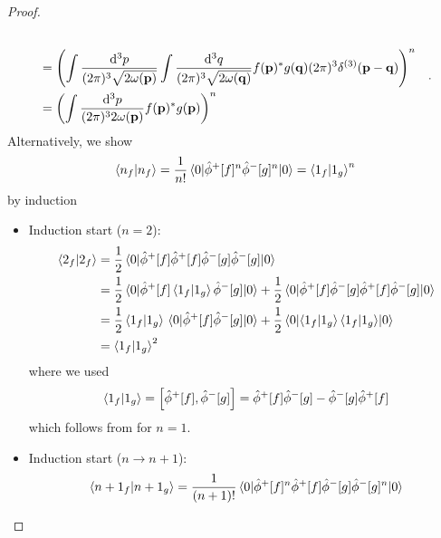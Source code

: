 \begin{proof}
\begin{equation*}
\begin{split}
			\\
			&=
			\left(
				\int\frac{\dd[3]{p}}{(2\pi)^3\sqrt{2\omega(\vb{p})}}
				\int\frac{\dd[3]{q}}{(2\pi)^3\sqrt{2\omega(\vb{q})}}
				f(\vb{p})^*
				g(\vb{q})
				(2\pi)^3
				\delta^{(3)}(\vb{p}-\vb{q})
			\right)^n
			\\
			&=
			\left(
				\int\frac{\dd[3]{p}}{(2\pi)^32\omega(\vb{p})}
				f(\vb{p})^*
				g(\vb{p})
			\right)^n
		\end{split}
		.
	\end{equation*}
	Alternatively, we show
	\begin{equation*}
		\braket{n_f}{n_f}
		=
		\frac{1}{n!}
		\expval{
			\hat\phi^+[f]^n
			\hat\phi^-[g]^n
		}{0}
		=
		\braket{1_f}{1_g}^n
	\end{equation*}
	 by induction
	\begin{itemize}
		\item Induction start ($n=2$):
		\begin{equation*}
			\begin{split}
				\braket{2_f}
				&=
				\frac{1}{2}
				\expval{
					\hat\phi^+[f]
					\hat\phi^+[f]
					\hat\phi^-[g]
					\hat\phi^-[g]
				}{0}
				\\
				&=
				\frac{1}{2}
				\expval{
					\hat\phi^+[f]
					\braket{1_f}{1_g}
					\hat\phi^-[g]
				}{0}
				+
				\frac{1}{2}
				\expval{
					\hat\phi^+[f]
					\hat\phi^-[g]
					\hat\phi^+[f]
					\hat\phi^-[g]
				}{0}
				\\
				&=
				\frac{1}{2}
				\braket{1_f}{1_g}
				\expval{
					\hat\phi^+[f]
					\hat\phi^-[g]
				}{0}
				+
				\frac{1}{2}
				\expval{
					\braket{1_f}{1_g}
					\braket{1_f}{1_g}
				}{0}
				\\
				&=
				\braket{1_f}{1_g}^2
			\end{split}
		\end{equation*}
		where we used
		\begin{equation*}
			\braket{1_f}{1_g}
			=
			\comm{\hat\phi^+[f]}{\hat\phi^-[g]}
			=
			\hat\phi^+[f]
			\hat\phi^-[g]
			-
			\hat\phi^-[g]
			\hat\phi^+[f]
		\end{equation*}
		which follows from  for $n=1$.
		\item Induction start ($n\to n+1$):
		\begin{equation*}
			\begin{split}
				\braket{n+1_f}{n+1_g}
				&=
				\frac{1}{(n+1)!}
				\expval{
					\hat\phi^+[f]^n
					\hat\phi^+[f]
					\hat\phi^-[g]
					\hat\phi^-[g]^n
				}{0}
				\\

\end{split}
\end{equation*}
\end{itemize}
\end{proof}
